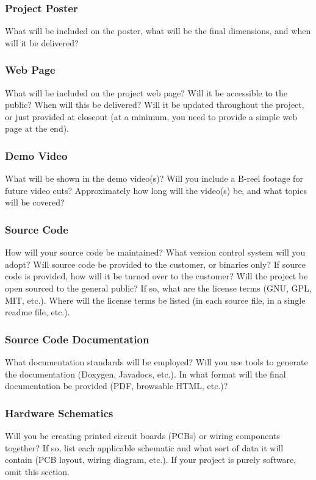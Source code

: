 \subsubsection{Project Poster}
What will be included on the poster, what will be the final dimensions, and when will it be delivered?

\subsubsection{Web Page}
What will be included on the project web page? Will it be accessible to the public? When will this be delivered? Will it be updated throughout the project, or just provided at closeout (at a minimum, you need to provide a simple web page at the end).

\subsubsection{Demo Video}
What will be shown in the demo video(s)? Will you include a B-reel footage for future video cuts? Approximately how long will the video(s) be, and what topics will be covered?

\subsubsection{Source Code}
How will your source code be maintained? What version control system will you adopt? Will source code be provided to the customer, or binaries only? If source code is provided, how will it be turned over to the customer? Will the project be open sourced to the general public? If so, what are the license terms (GNU, GPL, MIT, etc.). Where will the license terms be listed (in each source file, in a single readme file, etc.).

\subsubsection{Source Code Documentation}
What documentation standards will be employed? Will you use tools to generate the documentation (Doxygen, Javadocs, etc.). In what format will the final documentation be provided (PDF, browsable HTML, etc.)?

\subsubsection{Hardware Schematics}
Will you be creating printed circuit boards (PCBs) or wiring components together? If so, list each applicable schematic and what sort of data it will contain (PCB layout, wiring diagram, etc.). If your project is purely software, omit this section.

